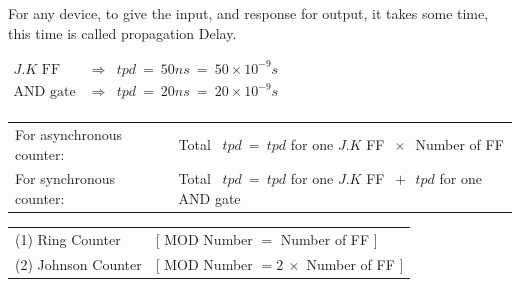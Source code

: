 \pagebreak
{}

For any device, to give the input, and response for output, it takes some time, this time is
called propagation Delay.

\begin{center}
   $\begin{array}{lll}
      J.K \text{ FF } & \Rightarrow &tpd \ = \ 50ns \ = \ 50\times 10^{-9} {s}\\
      \text{AND gate } & \Rightarrow &tpd \ = \ 20ns \ = \ 20\times 10^{-9} {s}\\
   \end{array}$
\end{center}


\begin{tabular}{ll}
   For asynchronous counter: &
   Total \ $tpd \ = \ tpd$ for one $J.K$  FF $ \ \times \ $ Number of FF\\
   For synchronous counter: &
   Total \ $tpd \ = \ tpd$ for one $J.K$  FF $ \ + \ \ tpd$ for one AND gate\\
\end{tabular}

\vspace{4em}
\begin{center}
   \begin{tabular}{ll}
   (1) Ring Counter &
   [ MOD Number $=$ Number of FF ]\\
   (2) Johnson Counter & 
   [ MOD Number $= 2 \ \times$ Number of FF ]\\
   \end{tabular}
\end{center}


\vspace{2em}

